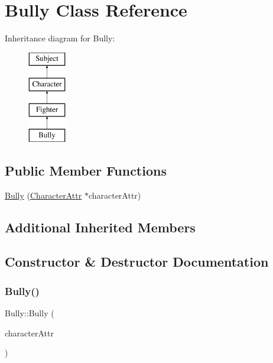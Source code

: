 \hypertarget{class_bully}{}\section{Bully Class Reference}
\label{class_bully}
Inheritance diagram for Bully\+:\begin{figure}[H]
\begin{center}
\leavevmode
\includegraphics[height=4.000000cm]{class_bully}
\end{center}
\end{figure}
\subsection*{Public Member Functions}
\begin{DoxyCompactItemize}
\item 
\hyperlink{class_bully_a9f1e3339afa55d82b91f8e64f2c4a724}{Bully} (\hyperlink{class_character_attr}{Character\+Attr} $\ast$character\+Attr)
\end{DoxyCompactItemize}
\subsection*{Additional Inherited Members}


\subsection{Constructor \& Destructor Documentation}
\hypertarget{class_bully_a9f1e3339afa55d82b91f8e64f2c4a724}{}\label{class_bully_a9f1e3339afa55d82b91f8e64f2c4a724} 
\subsubsection{\texorpdfstring{Bully()}{Bully()}}
{\footnotesize\ttfamily Bully\+::\+Bully (\begin{DoxyParamCaption}\item[{\hyperlink{class_character_attr}{Character\+Attr} $\ast$}]{character\+Attr }\end{DoxyParamCaption})}

